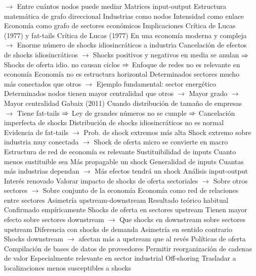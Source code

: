 \documentclass{nuevotema}
\begin{document}
\begin{esquemal}
				\4[] $\to$ Entre cuántos nodos puede mediar
			\3 Matrices input-output
				\4 Estructura matemática de grafo direccional
				\4 Industrias como nodos
				\4 Intensidad como enlace
				\4[$\then$] Economía como grafo de sectores económicos
		\2 Implicaciones
			\3 Crítica de Lucas (1977) y fat-tails
				\4 Crítica de Lucas (1977)
				\4[] En una economía moderna y compleja
				\4[] $\to$ Enorme número de shocks idiosincráticos a industria
				\4[] Cancelación de efectos de shocks idiosincráticos
				\4[] $\to$ Shocks positivos y negativos en media se anulan
				\4[] $\then$ Shocks de oferta idio. no causan ciclos
				\4[] $\then$ Enfoque de redes no es relevante en economía
				\4 Economía no es estructura horizontal
				\4[] Determinados sectores mucho más conectados que otros
				\4[] $\to$ Ejemplo fundamental: sector energético
				\4[] Determinados nodos tienen mayor centralidad que otros
				\4[] $\to$ Mayor grado
				\4[] $\to$ Mayor centralidad
				\4 Gabaix (2011)
				\4[] Cuando distribución de tamaño de empresas
				\4[] $\to$ Tiene fat-tails
				\4[] $\then$ Ley de grandes números no se cumple
				\4[] $\then$ Cancelación imperfecta de shocks
				\4 Distribución de shocks idiosincráticos no es normal
				\4[] Evidencia de fat-tails
				\4[] $\to$ Prob. de shock extremos más alta
				\4[] Shock extremo sobre industria muy conectada
				\4[] $\to$ Shock de oferta micro se convierte en macro
			\3 Estructura de red de economía es relevante
				\4 Sustituibilidad de inputs
				\4[] Cuanto menos sustituible sea
				\4[] Más propagable un shock
				\4 Generalidad de inputs
				\4[] Cuantas más industrias dependan
				\4[] $\to$ Más efectos tendrá un shock
			\3 Análisis input-output
				\4 Interés renovado
				\4 Valorar impacto de shocks de oferta sectoriales
				\4[] $\to$ Sobre otros sectores
				\4[] $\to$ Sobre conjunto de la economía
				\4 Economía como red de relaciones entre sectores
			\3 Asimetría upstream-downstream
				\4 Resultado teórico habitual
				\4 Confirmado empíricamente
				\4 Shocks de oferta en sectores upstream
				\4[] Tienen mayor efecto sobre sectores downstream
				\4[] $\to$ Que shocks en downstream sobre sectores upstream
				\4 Diferencia con shocks de demanda
				\4[] Asimetría en sentido contrario
				\4[] Shocks downstream
				\4[] $\to$ afectan más a upstream que al revés
			\3 Políticas de oferta
				\4 Compilación de bases de datos de proveedores
				\4[] Permitir reorganización de cadenas de valor
				\4[] Especialmente relevante en sector industrial
				\4 Off-shoring
				\4[] Trasladar a localizaciones menos susceptibles a shocks

\end{esquemal}
\end{document}
